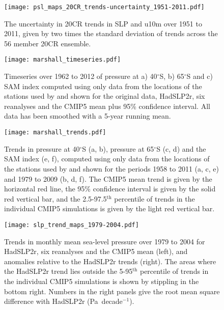 \documentclass{ametsoc}
\begin{document}
\begin{figure}[t]
  \noindent\texttt{[image: psl\_maps\_20CR\_trends-uncertainty\_1951-2011.pdf]}\\
  \caption{The uncertainty in 20CR trends in SLP and u10m over 1951 to 2011, given
           by two times the standard deviation of trends across the 56 member 20CR ensemble.}
           \label{fig:20CR_uncertainty_map}
\end{figure}

\begin{figure}[t]
  \noindent\texttt{[image: marshall\_timeseries.pdf]}\\
  \caption{Timeseries over 1962 to 2012 of pressure at a) 40$^{\circ}$S, b) 65$^{\circ}$S and 
          c) SAM index computed
          using only data from the locations of the stations used by \cite{Marshall_2003} and shown for
          the original \cite{Marshall_2003} data, HadSLP2r, six reanalyses and the CMIP5 mean plus 95\% 
          confidence interval. All data has been smoothed with a 5-year running mean.} \label{fig:marshall_timeseries}
\end{figure}

\begin{figure}[t]
  \noindent\texttt{[image: marshall\_trends.pdf]}\\
  \caption{Trends in pressure at 40$^{\circ}$S (a, b), pressure at 65$^{\circ}$S (c, d) and the 
  SAM index (e, f), computed using only data from the locations of the stations used by 
   \cite{Marshall_2003} and shown for the periods 1958 to 2011 (a, c, e) and 1979 to 2009 
  (b, d, f). The CMIP5 mean trend is given by the horizontal red line, the 95\% confidence
   interval is given by the solid red vertical bar, and the 2.5-97.5$^\textrm{th}$ percentile of
    trends in the individual CMIP5 simulations is given by the light red vertical
     bar.}\label{fig:marshall_trends}
\end{figure}

\begin{figure}[t]
  \noindent\texttt{[image: slp\_trend\_maps\_1979-2004.pdf]}\\
  \caption{Trends in monthly mean sea-level pressure over 1979 to 2004 for HadSLP2r, six reanalyses and
   the CMIP5 mean (left), and anomalies relative to the HadSLP2r trends (right). The areas
    where the HadSLP2r trend lies outside the 5-95$^\textrm{th}$ percentile of trends in the
     individual CMIP5 simulations is shown by stippling in the bottom right. Numbers in the 
     right panels give the root mean square difference with
      HadSLP2r (Pa~decade$^{-1}$).}\label{fig:slp_trend_maps_1979-2004}
\end{figure}
\end{document}
